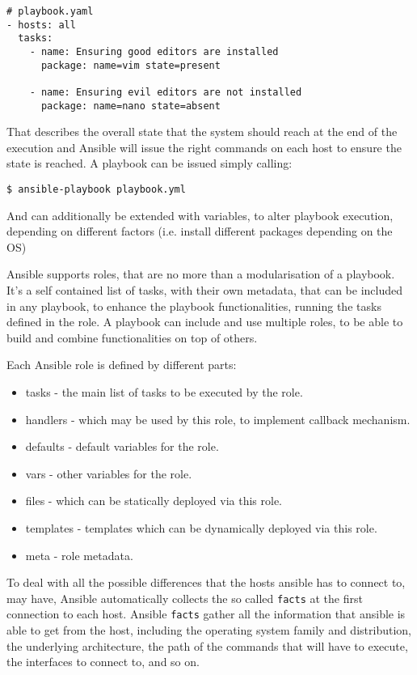 \documentclass[11pt]{article}
\begin{document}
\begin{verbatim}
# playbook.yaml
- hosts: all
  tasks:
    - name: Ensuring good editors are installed
      package: name=vim state=present
      
    - name: Ensuring evil editors are not installed
      package: name=nano state=absent
\end{verbatim}

That describes the overall state that the system should reach at the end of the execution and Ansible will issue the right commands on each host to ensure the state is reached.
A playbook can be issued simply calling:

\begin{verbatim}
$ ansible-playbook playbook.yml
\end{verbatim}

And can additionally be extended with variables, to alter playbook execution, depending on different factors (i.e. install different packages depending on the OS)

Ansible supports roles, that are no more than a modularisation of a playbook. It's a self contained list of tasks, with their own metadata, that can be included in any playbook, to enhance the playbook functionalities, running the tasks defined in the role. A playbook can include and use multiple roles, to be able to build and combine functionalities on top of others. 

\bigskip
Each Ansible role is defined by different parts:

\begin{itemize}
\item tasks - the main list of tasks to be executed by the role.
\item handlers - which may be used by this role, to implement callback mechanism.
\item defaults - default variables for the role.
\item vars - other variables for the role.
\item files - which can be statically deployed via this role.
\item templates - templates which can be dynamically deployed via this role.
\item meta - role metadata.
\end{itemize}

To deal with all the possible differences that the hosts ansible has to connect to, may have, Ansible automatically collects the so called {\tt facts} at the first connection to each host. Ansible {\tt facts} gather all the information that ansible is able to get from the host, including the operating system family and distribution, the underlying architecture, the path of the commands that will have to execute, the interfaces to connect to, and so on. 
\end{document}
